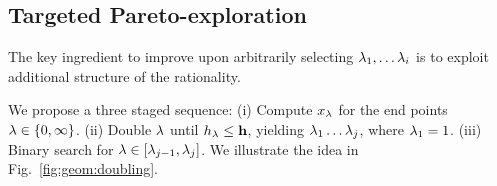 %

\subsection{Targeted Pareto-exploration}
The key ingredient to improve upon arbitrarily selecting $\lambda_1, \hdots \lambda_i$ is to exploit additional structure of the rationality.  
%
%

We propose a three staged sequence: (i) Compute $x_\lambda$ for the end
points $\lambda \in \{0, \infty\}$.  (ii) Double $\lambda$ until $h_\lambda \leq
\mathbf{h}$, yielding $\lambda_1\ldots \lambda_j$, where $\lambda_1 = 1$.
(iii) Binary search for $\lambda \in [\lambda_{j-1}, \lambda_{j}]$. We illustrate the idea in Fig.~\ref{fig:geom:doubling}.

